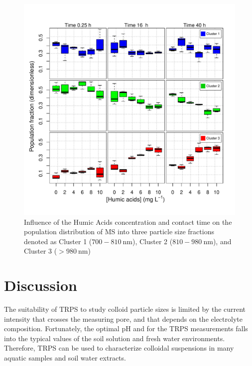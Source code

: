 \documentclass[journal=langd5,manuscript=article]{achemso}
\begin{document}
\begin{figure}
 \includegraphics[width=\linewidth]{Figures/Boxplot_MS_HA_CaCl2_populations.pdf}
  \caption{Influence of the Humic Acids concentration and contact time on the population distribution of MS into three particle size fractions denoted as
  Cluster 1 ($700 - 810~\mathrm{nm}$),  Cluster 2 ($810 - 980~\mathrm{nm}$), 
  and
  Cluster 3 ($ > 980~\mathrm{nm}$)
  }
  \label{fgr:boxplot_populations}
\end{figure}






\section{Discussion}


%
The suitability of TRPS to study colloid particle sizes is limited by the current intensity that crosses the measuring pore, and  that depends on the electrolyte composition. Fortunately, the optimal pH and \ce{[Ca^{2+}]} for the TRPS measurements falls into the typical values of the soil solution\cite{wolt1994soil} and  fresh water environments\cite{Stumm1993}. Therefore, TRPS can be used to characterize colloidal suspensions in many  aquatic samples and soil water extracts.
\end{document}

